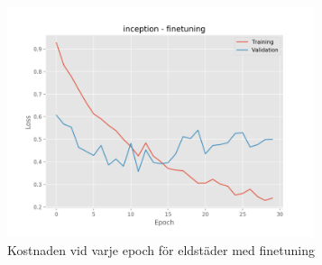 \documentclass[]{kththesis}
\begin{document}
\begin{figure}[h]
    \includegraphics[width=9cm]{f_l_inception_fine}
    \caption{Kostnaden vid varje epoch för eldstäder med finetuning}
    \label{fig:f_l_2}
  \end{figure}
\end{document}
